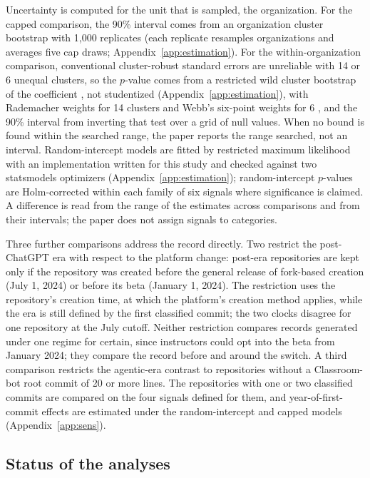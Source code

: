 \documentclass[acmsmall,screen,review,anonymous]{acmart}
\begin{document}
Uncertainty is computed for the unit that is sampled, the organization. For the capped comparison, the 90\% interval comes from an organization cluster bootstrap with 1,000 replicates (each replicate resamples organizations and averages five cap draws; Appendix~\ref{app:estimation}). For the within-organization comparison, conventional cluster-robust standard errors are unreliable with 14 or 6 unequal clusters, so the $p$-value comes from a restricted wild cluster bootstrap of the coefficient \citep{cameron2008bootstrap, roodman2019boottest}, not studentized (Appendix~\ref{app:estimation}), with Rademacher weights for 14 clusters and Webb's six-point weights for 6 \citep{webb2023reworking}, and the 90\% interval from inverting that test over a grid of null values. When no bound is found within the searched range, the paper reports the range searched, not an interval. Random-intercept models are fitted by restricted maximum likelihood with an implementation written for this study and checked against two statsmodels optimizers (Appendix~\ref{app:estimation}); random-intercept $p$-values are Holm-corrected within each family of six signals where significance is claimed. A difference is read from the range of the estimates across comparisons and from their intervals; the paper does not assign signals to categories.

Three further comparisons address the record directly. Two restrict the post-ChatGPT era with respect to the platform change: post-era repositories are kept only if the repository was created before the general release of fork-based creation (July 1, 2024) or before its beta (January 1, 2024). The restriction uses the repository's creation time, at which the platform's creation method applies, while the era is still defined by the first classified commit; the two clocks disagree for one repository at the July cutoff. Neither restriction compares records generated under one regime for certain, since instructors could opt into the beta from January 2024; they compare the record before and around the switch. A third comparison restricts the agentic-era contrast to repositories without a Classroom-bot root commit of 20 or more lines. The repositories with one or two classified commits are compared on the four signals defined for them, and year-of-first-commit effects are estimated under the random-intercept and capped models (Appendix~\ref{app:sens}).

\subsection{Status of the analyses}
\label{sec:status}
\end{document}
